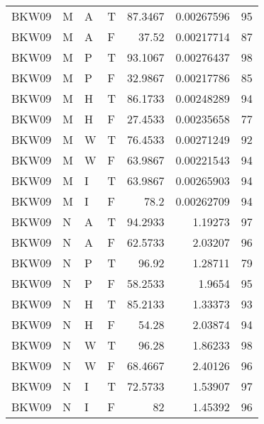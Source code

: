 \begin{tabular}{llllrrr}
    BKW09    & M     & A     & T          & 87.3467    & 0.00267596  & 95       \\
    BKW09    & M     & A     & F          & 37.52      & 0.00217714  & 87       \\
    BKW09    & M     & P     & T          & 93.1067    & 0.00276437  & 98       \\
    BKW09    & M     & P     & F          & 32.9867    & 0.00217786  & 85       \\
    BKW09    & M     & H     & T          & 86.1733    & 0.00248289  & 94       \\
    BKW09    & M     & H     & F          & 27.4533    & 0.00235658  & 77       \\
    BKW09    & M     & W     & T          & 76.4533    & 0.00271249  & 92       \\
    BKW09    & M     & W     & F          & 63.9867    & 0.00221543  & 94       \\
    BKW09    & M     & I     & T          & 63.9867    & 0.00265903  & 94       \\
    BKW09    & M     & I     & F          & 78.2       & 0.00262709  & 94       \\
    BKW09    & N     & A     & T          & 94.2933    & 1.19273     & 97       \\
    BKW09    & N     & A     & F          & 62.5733    & 2.03207     & 96       \\
    BKW09    & N     & P     & T          & 96.92      & 1.28711     & 79       \\
    BKW09    & N     & P     & F          & 58.2533    & 1.9654      & 95       \\
    BKW09    & N     & H     & T          & 85.2133    & 1.33373     & 93       \\
    BKW09    & N     & H     & F          & 54.28      & 2.03874     & 94       \\
    BKW09    & N     & W     & T          & 96.28      & 1.86233     & 98       \\
    BKW09    & N     & W     & F          & 68.4667    & 2.40126     & 96       \\
    BKW09    & N     & I     & T          & 72.5733    & 1.53907     & 97       \\
    BKW09    & N     & I     & F          & 82         & 1.45392     & 96       \\
    \hline
\end{tabular}